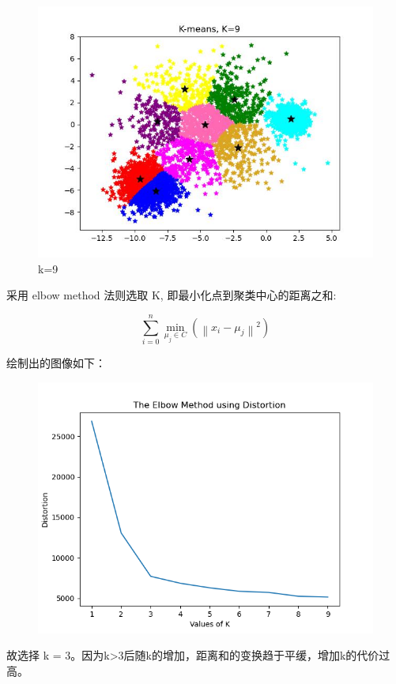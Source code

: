 \documentclass[UTF8]{ctexart}
\begin{document}
\begin{figure}[H]
\begin{minipage}{0.32\linewidth}
		\includegraphics[width=0.9\linewidth]{k=9.jpg}
		\caption{k=9}
		\label{chutian2}%
	\end{minipage}

\end{figure}

采用 elbow method 法则选取 $\mathrm{K}$, 即最小化点到聚类中心的距离之和:

$$
\sum_{i=0}^{n} \min _{\mu_{j} \in C}\left(\left\|x_{i}-\mu_{j}\right\|^{2}\right)
$$

绘制出的图像如下：

\begin{figure}[H]
  \centering
  \includegraphics[scale=0.23]{myplot.png}
\end{figure}

故选择 k = 3。因为k>3后随k的增加，距离和的变换趋于平缓，增加k的代价过高。
\end{document}
